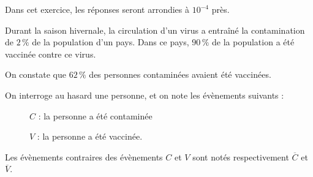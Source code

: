 \medskip

Dans cet exercice, les réponses seront arrondies à $10^{-4}$ près.

\bigskip

Durant la saison hivernale, la circulation d'un virus a entraîné la contamination de $2\,\%$ de la population d'un pays. Dans ce pays, $90\,\%$ de la population a été vaccinée contre ce virus.

On constate que $62\,\%$ des personnes contaminées avaient été vaccinées.


\bigskip

On interroge au hasard une personne, et on note les évènements suivants :

\begin{description}
\item[ ] $C$ : \og la personne a été contaminée\fg{}
\item[ ] $V$ : \og la personne a été vaccinée\fg{}.
\end{description}

Les évènements contraires des évènements $C$ et $V$ sont notés respectivement $\overline{C}$ et $\overline{V}$.

\medskip

